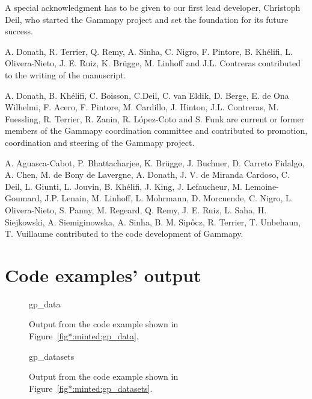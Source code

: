 \documentclass[longauth]{aa}
\newcommand{\gammapy}{Gammapy\xspace}
\begin{document}
\begin{acknowledgements}
        A special acknowledgment has to be given to our first lead developer, Christoph Deil, who
        started the \gammapy project and set the foundation for its future success.

        A. Donath, R. Terrier, Q. Remy, A. Sinha, C. Nigro, F. Pintore, B. Khélifi, L. Olivera-Nieto, J. E. Ruiz,
        K. Brügge, M. Linhoff and J.L. Contreras contributed to the writing of the manuscript.
        
        A. Donath, B. Khélifi, C. Boisson, C.Deil, C. van Eldik, D. Berge, E. de Ona Wilhelmi, F. Acero, F. Pintore,
        M. Cardillo, J. Hinton, J.L. Contreras, M. Fuessling, R. Terrier, R. Zanin, R. López-Coto and S. Funk
        are current or former members of the Gammapy coordination committee and contributed to promotion, coordination
        and steering of the \gammapy project.

        A. Aguasca-Cabot, P. Bhattacharjee, K. Brügge, J. Buchner, D. Carreto Fidalgo, A. Chen, M. de Bony de Lavergne,
        A. Donath, J. V. de Miranda Cardoso, C. Deil, L. Giunti, L. Jouvin, B. Khélifi, J. King, J. Lefaucheur,
        M. Lemoine-Goumard, J.P. Lenain, M. Linhoff, L. Mohrmann, D. Morcuende, C. Nigro, L. Olivera-Nieto,
        S. Panny, M. Regeard, Q. Remy, J. E. Ruiz, L. Saha, H. Siejkowski, A. Siemiginowska, A. Sinha,
        B. M. Sipőcz, R. Terrier, T. Unbehaun, T. Vuillaume contributed to the code development of \gammapy.



\end{acknowledgements}





\appendix
\section{Code examples' output}

\begin{figure}[!ht]
        \small
    	{gp_data}
        \caption{Output from the code example shown in Figure~\ref{fig*:minted:gp_data}.}
        \label{fig:code_example_gp_data}
\end{figure}


\begin{figure}[!ht]
        \small
        {gp_datasets}
        \caption{Output from the code example shown in Figure~\ref{fig*:minted:gp_datasets}.}
        \label{fig:code_example_gp_datasets}
\end{figure}
\end{document}
